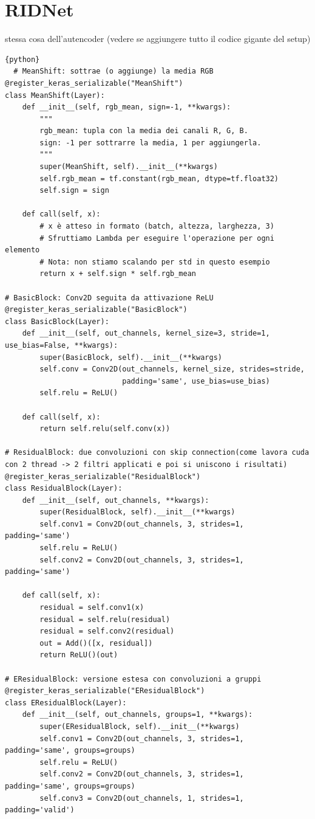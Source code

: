\documentclass[12pt,a4paper,openright,twoside]{book}
\begin{document}
\section{RIDNet}
stessa cosa dell'autencoder (vedere se aggiungere tutto il codice gigante del setup)
\begin{lstlisting}{python}
  # MeanShift: sottrae (o aggiunge) la media RGB
@register_keras_serializable("MeanShift")
class MeanShift(Layer):
    def __init__(self, rgb_mean, sign=-1, **kwargs):
        """
        rgb_mean: tupla con la media dei canali R, G, B.
        sign: -1 per sottrarre la media, 1 per aggiungerla.
        """
        super(MeanShift, self).__init__(**kwargs)
        self.rgb_mean = tf.constant(rgb_mean, dtype=tf.float32)
        self.sign = sign

    def call(self, x):
        # x è atteso in formato (batch, altezza, larghezza, 3)
        # Sfruttiamo Lambda per eseguire l'operazione per ogni elemento
        # Nota: non stiamo scalando per std in questo esempio
        return x + self.sign * self.rgb_mean

# BasicBlock: Conv2D seguita da attivazione ReLU
@register_keras_serializable("BasicBlock")
class BasicBlock(Layer):
    def __init__(self, out_channels, kernel_size=3, stride=1, use_bias=False, **kwargs):
        super(BasicBlock, self).__init__(**kwargs)
        self.conv = Conv2D(out_channels, kernel_size, strides=stride,
                           padding='same', use_bias=use_bias)
        self.relu = ReLU()

    def call(self, x):
        return self.relu(self.conv(x))

# ResidualBlock: due convoluzioni con skip connection(come lavora cuda con 2 thread -> 2 filtri applicati e poi si uniscono i risultati)
@register_keras_serializable("ResidualBlock")
class ResidualBlock(Layer):
    def __init__(self, out_channels, **kwargs):
        super(ResidualBlock, self).__init__(**kwargs)
        self.conv1 = Conv2D(out_channels, 3, strides=1, padding='same')
        self.relu = ReLU()
        self.conv2 = Conv2D(out_channels, 3, strides=1, padding='same')

    def call(self, x):
        residual = self.conv1(x)
        residual = self.relu(residual)
        residual = self.conv2(residual)
        out = Add()([x, residual])
        return ReLU()(out)

# EResidualBlock: versione estesa con convoluzioni a gruppi
@register_keras_serializable("EResidualBlock")
class EResidualBlock(Layer):
    def __init__(self, out_channels, groups=1, **kwargs):
        super(EResidualBlock, self).__init__(**kwargs)
        self.conv1 = Conv2D(out_channels, 3, strides=1, padding='same', groups=groups)
        self.relu = ReLU()
        self.conv2 = Conv2D(out_channels, 3, strides=1, padding='same', groups=groups)
        self.conv3 = Conv2D(out_channels, 1, strides=1, padding='valid')


\end{lstlisting}
\end{document}
